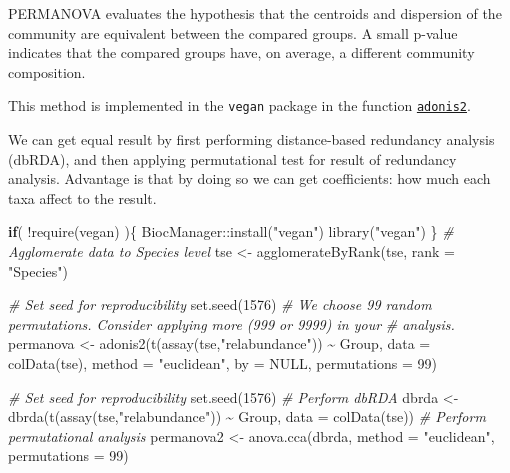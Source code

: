 \documentclass[
]{book}
\newenvironment{Shaded}{\begin{snugshade}}{\end{snugshade}}
\newcommand{\AttributeTok}[1]{\textcolor[rgb]{0.77,0.63,0.00}{#1}}
\newcommand{\CommentTok}[1]{\textcolor[rgb]{0.56,0.35,0.01}{\textit{#1}}}
\newcommand{\ConstantTok}[1]{\textcolor[rgb]{0.00,0.00,0.00}{#1}}
\newcommand{\ControlFlowTok}[1]{\textcolor[rgb]{0.13,0.29,0.53}{\textbf{#1}}}
\newcommand{\DecValTok}[1]{\textcolor[rgb]{0.00,0.00,0.81}{#1}}
\newcommand{\FunctionTok}[1]{\textcolor[rgb]{0.00,0.00,0.00}{#1}}
\newcommand{\NormalTok}[1]{#1}
\newcommand{\OtherTok}[1]{\textcolor[rgb]{0.56,0.35,0.01}{#1}}
\newcommand{\SpecialCharTok}[1]{\textcolor[rgb]{0.00,0.00,0.00}{#1}}
\newcommand{\StringTok}[1]{\textcolor[rgb]{0.31,0.60,0.02}{#1}}
\begin{document}
PERMANOVA evaluates the hypothesis that the centroids and dispersion
of the community are equivalent between the compared groups. A small
p-value indicates that the compared groups have, on average, a
different community composition.

This method is implemented in the \texttt{vegan} package in the function
\href{https://www.rdocumentation.org/packages/vegan/versions/2.4-2/topics/adonis}{\texttt{adonis2}}.

We can get equal result by first performing distance-based redundancy analysis (dbRDA),
and then applying permutational test for result of redundancy analysis. Advantage is
that by doing so we can get coefficients: how much each taxa affect to the result.

\begin{Shaded}
\begin{Highlighting}[]
\ControlFlowTok{if}\NormalTok{( }\SpecialCharTok{!}\FunctionTok{require}\NormalTok{(vegan) )\{}
\NormalTok{    BiocManager}\SpecialCharTok{::}\FunctionTok{install}\NormalTok{(}\StringTok{"vegan"}\NormalTok{)}
    \FunctionTok{library}\NormalTok{(}\StringTok{"vegan"}\NormalTok{)}
\NormalTok{\}}
\CommentTok{\# Agglomerate data to Species level}
\NormalTok{tse }\OtherTok{\textless{}{-}} \FunctionTok{agglomerateByRank}\NormalTok{(tse, }\AttributeTok{rank =} \StringTok{"Species"}\NormalTok{)}

\CommentTok{\# Set seed for reproducibility}
\FunctionTok{set.seed}\NormalTok{(}\DecValTok{1576}\NormalTok{)}
\CommentTok{\# We choose 99 random permutations. Consider applying more (999 or 9999) in your}
\CommentTok{\# analysis. }
\NormalTok{permanova }\OtherTok{\textless{}{-}} \FunctionTok{adonis2}\NormalTok{(}\FunctionTok{t}\NormalTok{(}\FunctionTok{assay}\NormalTok{(tse,}\StringTok{"relabundance"}\NormalTok{)) }\SpecialCharTok{\textasciitilde{}}\NormalTok{ Group,}
                     \AttributeTok{data =} \FunctionTok{colData}\NormalTok{(tse),}
                     \AttributeTok{method =} \StringTok{"euclidean"}\NormalTok{,}
                     \AttributeTok{by =} \ConstantTok{NULL}\NormalTok{,}
                     \AttributeTok{permutations =} \DecValTok{99}\NormalTok{)}

\CommentTok{\# Set seed for reproducibility}
\FunctionTok{set.seed}\NormalTok{(}\DecValTok{1576}\NormalTok{)}
\CommentTok{\# Perform dbRDA}
\NormalTok{dbrda }\OtherTok{\textless{}{-}} \FunctionTok{dbrda}\NormalTok{(}\FunctionTok{t}\NormalTok{(}\FunctionTok{assay}\NormalTok{(tse,}\StringTok{"relabundance"}\NormalTok{)) }\SpecialCharTok{\textasciitilde{}}\NormalTok{ Group, }
               \AttributeTok{data =} \FunctionTok{colData}\NormalTok{(tse))}
\CommentTok{\# Perform permutational analysis}
\NormalTok{permanova2 }\OtherTok{\textless{}{-}} \FunctionTok{anova.cca}\NormalTok{(dbrda,}
                        \AttributeTok{method =} \StringTok{"euclidean"}\NormalTok{,}
                        \AttributeTok{permutations =} \DecValTok{99}\NormalTok{)}


\end{Highlighting}
\end{Shaded}
\end{document}
